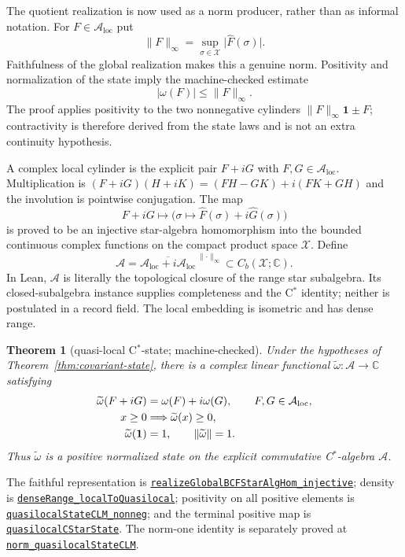 \documentclass[11pt]{article}
\newtheorem{theorem}{Theorem}[section]
\theoremstyle{definition}
\newcommand{\one}{\mathbf 1}
\newcommand{\abs}[1]{\lvert #1\rvert}
\newcommand{\norm}[1]{\lVert #1\rVert}
\newcommand{\sourceanchor}{f587b35001f4ae87c7fe0383662864df6bc9a1c0}
\newcommand{\leanline}[3]{%
  \href{https://github.com/lluiseriksson/THE-ERIKSSON-PROGRAMME/blob/\sourceanchor/YangMills/OS/#1.lean\#L#2}{\nolinkurl{#3}}}
\begin{document}
The quotient realization is now used as a norm producer, rather than as
informal notation.  For $F\in\mathcal A_{\mathrm{loc}}$ put
\[
  \norm F_\infty=\sup_{\sigma\in\mathcal X}\abs{\widehat F(\sigma)}.
\]
Faithfulness of the global realization makes this a genuine norm.  Positivity
and normalization of the state imply the machine-checked estimate
\[
  \abs{\omega(F)}\le \norm F_\infty.
\]
The proof applies positivity to the two nonnegative cylinders
$\norm F_\infty\one\pm F$; contractivity is therefore derived from the state
laws and is not an extra continuity hypothesis.

A complex local cylinder is the explicit pair $F+iG$ with
$F,G\in\mathcal A_{\mathrm{loc}}$.  Multiplication is
$(F+iG)(H+iK)=(FH-GK)+i(FK+GH)$ and the involution is pointwise conjugation.
The map
\[
 F+iG\longmapsto
 \bigl(\sigma\mapsto\widehat F(\sigma)+i\widehat G(\sigma)\bigr)
\]
is proved to be an injective star-algebra homomorphism into the bounded
continuous complex functions on the compact product space $\mathcal X$.
Define
\[
  \mathcal A=\overline{\mathcal A_{\mathrm{loc}}+i\mathcal A_{\mathrm{loc}}}
     ^{\,\norm\cdot_\infty}
  \subset C_b(\mathcal X;\mathbb C).
\]
In Lean, $\mathcal A$ is literally the topological closure of the range star
subalgebra.  Its closed-subalgebra instance supplies completeness and the
C$^*$ identity; neither is postulated in a record field.  The local embedding
is isometric and has dense range.

\begin{theorem}[quasi-local C$^*$-state; machine-checked]
\label{thm:cstar-state}
Under the hypotheses of Theorem~\ref{thm:covariant-state}, there is a complex
linear functional $\widetilde\omega:\mathcal A\to\mathbb C$ satisfying
\begin{align*}
 \widetilde\omega(F+iG)&=\omega(F)+i\omega(G),\qquad F,G\in\mathcal A_{\rm loc},\\
 x\ge0&\Longrightarrow \widetilde\omega(x)\ge0,\\
 \widetilde\omega(\one)&=1,\qquad \norm{\widetilde\omega}=1.
\end{align*}
Thus $\widetilde\omega$ is a positive normalized state on the explicit
commutative C$^*$-algebra $\mathcal A$.
\end{theorem}

The faithful representation is
\leanline{DobrushinCStarState}{423}{realizeGlobalBCFStarAlgHom_injective};
density is
\leanline{DobrushinCStarState}{737}{denseRange_localToQuasilocal}; positivity
on all positive elements is
\leanline{DobrushinCStarState}{812}{quasilocalStateCLM_nonneg}; and the terminal
positive map is
\leanline{DobrushinCStarState}{866}{quasilocalCStarState}.  The norm-one
identity is separately proved at
\leanline{DobrushinCStarState}{843}{norm_quasilocalStateCLM}.
\end{document}
